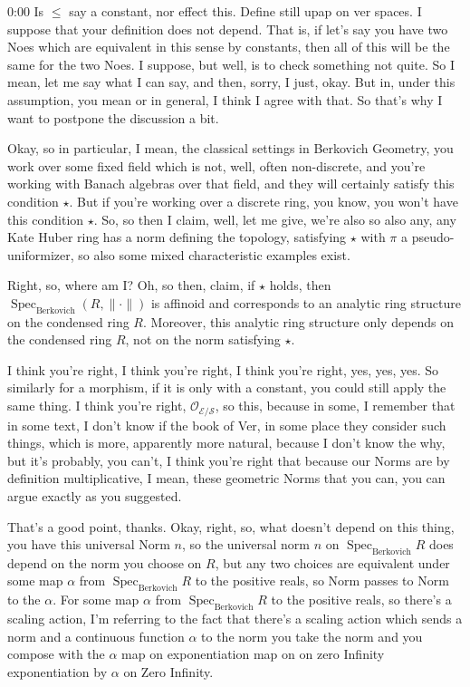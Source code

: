 \begin{unfinished}{0:00}
Is $\leq$ say a constant, nor effect this. Define still upap on ver spaces. I suppose that your definition does not depend. That is, if let's say you have two Noes which are equivalent in this sense by constants, then all of this will be the same for the two Noes. I suppose, but well, is to check something not quite. So I mean, let me say what I can say, and then, sorry, I just, okay. But in, under this assumption, you mean or in general, I think I agree with that. So that's why I want to postpone the discussion a bit. 

Okay, so in particular, I mean, the classical settings in Berkovich Geometry, you work over some fixed field which is not, well, often non-discrete, and you're working with Banach algebras over that field, and they will certainly satisfy this condition $\star$. But if you're working over a discrete ring, you know, you won't have this condition $\star$. So, so then I claim, well, let me give, we're also so also any, any Kate Huber ring has a norm defining the topology, satisfying $\star$ with $\pi$ a pseudo-uniformizer, so also some mixed characteristic examples exist.

Right, so, where am I? Oh, so then, claim, if $\star$ holds, then $\operatorname{Spec}_{\mathrm{Berkovich}} (R, \|\cdot\|)$ is affinoid and corresponds to an analytic ring structure on the condensed ring $R$. Moreover, this analytic ring structure only depends on the condensed ring $R$, not on the norm satisfying $\star$.

I think you're right, I think you're right, I think you're right, yes, yes, yes. So similarly for a morphism, if it is only with a constant, you could still apply the same thing. I think you're right, $\mathcal{O}_{\mathcal{E}/\mathcal{S}}$, so this, because in some, I remember that in some text, I don't know if the book of Ver, in some place they consider such things, which is more, apparently more natural, because I don't know the why, but it's probably, you can't, I think you're right that because our Norms are by definition multiplicative, I mean, these geometric Norms that you can, you can argue exactly as you suggested.

That's a good point, thanks. Okay, right, so, what doesn't depend on this thing, you have this universal Norm $n$, so the universal norm $n$ on $\operatorname{Spec}_{\mathrm{Berkovich}} R$ does depend on the norm you choose on $R$, but any two choices are equivalent under some map $\alpha$ from $\operatorname{Spec}_{\mathrm{Berkovich}} R$ to the positive reals, so Norm passes to Norm to the $\alpha$. For some map $\alpha$ from $\operatorname{Spec}_{\mathrm{Berkovich}} R$ to the positive reals, so there's a scaling action, I'm referring to the fact that there's a scaling action which sends a norm and a continuous function $\alpha$ to the norm you take the norm and you compose with the $\alpha$ map on exponentiation map on on zero Infinity exponentiation by $\alpha$ on Zero Infinity.


\end{unfinished}
